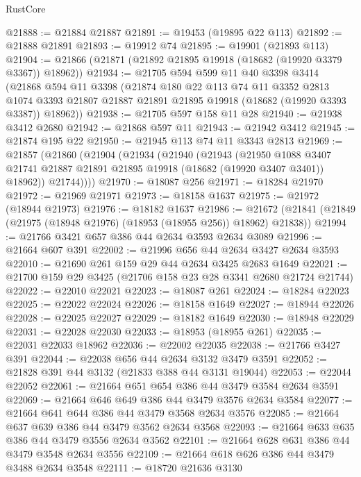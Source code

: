 \begin{lexlean}{RustCore}
\begin{coremodule}
@21888 := @21884 @21887
@21891 := @19453 (@19895 @22 @113)
@21892 := @21888 @21891
@21893 := @19912 @74
@21895 := @19901 (@21893 @113)
@21904 := @21866 (@21871 (@21892 @21895 @19918 (@18682 (@19920 @3379 @3367)) @18962))
@21934 := @21705
    @594
    @599
    @11
    @40
    @3398
    @3414
    (@21868
      @594
      @11
      @3398
      (@21874
        @180
        @22
        @113
        @74
        @11
        @3352
        @2813
        @1074
        @3393
        @21807
        @21887
        @21891
        @21895
        @19918
        (@18682 (@19920 @3393 @3387))
        @18962))
@21938 := @21705 @597 @158 @11 @28
@21940 := @21938 @3412 @2680
@21942 := @21868 @597 @11
@21943 := @21942 @3412
@21945 := @21874 @195 @22
@21950 := @21945 @113 @74 @11 @3343 @2813
@21969 := @21857
    (@21860
      (@21904
        (@21934
          (@21940
            (@21943
              (@21950
                @1088
                @3407
                @21741
                @21887
                @21891
                @21895
                @19918
                (@18682 (@19920 @3407 @3401))
                @18962))
            @21744))))
@21970 := @18087 @256
@21971 := @18284 @21970
@21972 := @21969 @21971
@21973 := @18158 @1637
@21975 := @21972 (@18944 @21973)
@21976 := @18182 @1637
@21986 := @21672 (@21841 (@21849 (@21975 (@18948 @21976) (@18953 (@18955 @256)) @18962) @21838))
@21994 := @21766 @3421 @657 @386 @44 @2634 @3593 @2634 @3089
@21996 := @21664 @607 @391
@22002 := @21996 @656 @44 @2634 @3427 @2634 @3593
@22010 := @21690 @261 @159 @29 @44 @2634 @3425 @2683 @1649
@22021 := @21700 @159 @29 @3425 (@21706 @158 @23 @28 @3341 @2680 @21724 @21744)
@22022 := @22010 @22021
@22023 := @18087 @261
@22024 := @18284 @22023
@22025 := @22022 @22024
@22026 := @18158 @1649
@22027 := @18944 @22026
@22028 := @22025 @22027
@22029 := @18182 @1649
@22030 := @18948 @22029
@22031 := @22028 @22030
@22033 := @18953 (@18955 @261)
@22035 := @22031 @22033 @18962
@22036 := @22002 @22035
@22038 := @21766 @3427 @391
@22044 := @22038 @656 @44 @2634 @3132 @3479 @3591
@22052 := @21828 @391 @44 @3132 (@21833 @388 @44 @3131 @19044)
@22053 := @22044 @22052
@22061 := @21664 @651 @654 @386 @44 @3479 @3584 @2634 @3591
@22069 := @21664 @646 @649 @386 @44 @3479 @3576 @2634 @3584
@22077 := @21664 @641 @644 @386 @44 @3479 @3568 @2634 @3576
@22085 := @21664 @637 @639 @386 @44 @3479 @3562 @2634 @3568
@22093 := @21664 @633 @635 @386 @44 @3479 @3556 @2634 @3562
@22101 := @21664 @628 @631 @386 @44 @3479 @3548 @2634 @3556
@22109 := @21664 @618 @626 @386 @44 @3479 @3488 @2634 @3548
@22111 := @18720 @21636 @3130

\end{coremodule}
\end{lexlean}
